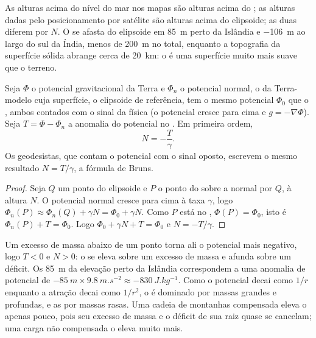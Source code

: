 As alturas acima do nível do mar nos mapas são alturas acima do ; as alturas dadas pelo posicionamento por satélite são alturas acima do elipsoide; as duas diferem por
$N$. O  se afasta do elipsoide em \qty{+85}{m} perto da Islândia e \qty{-106}{m} ao largo do sul da Índia, menos de \qty{200}{m} no total, enquanto a topografia
da superfície sólida abrange cerca de \qty{20}{km}: o  é uma superfície muito mais suave que o terreno.

\begin{proposition}\label{prop:b1:isostasy-gravity:bruns}
Seja $\Phi$ o potencial gravitacional da Terra e $\Phi_n$ o potencial normal,
o da Terra-modelo cuja superfície, o elipsoide de referência, tem o mesmo
potencial $\Phi_0$ que o , ambos contados com o sinal da física (o
potencial cresce para cima e $g = -\nabla\Phi$). Seja $T = \Phi - \Phi_n$ a
anomalia do potencial no . Em primeira ordem,
\[
  N = -\frac{T}{\gamma} .
\]
Os geodesistas, que contam o potencial com o sinal oposto, escrevem o mesmo
resultado $N = T/\gamma$, a fórmula de Bruns.
\end{proposition}

\begin{proof}
Seja $Q$ um ponto do elipsoide e $P$ o ponto do  sobre a
normal por $Q$, à altura $N$. O potencial normal cresce para cima
à taxa $\gamma$, logo $\Phi_n(P) \approx \Phi_n(Q) + \gamma N = \Phi_0 +
\gamma N$. Como $P$ está no , $\Phi(P) = \Phi_0$, isto é
$\Phi_n(P) + T = \Phi_0$. Logo $\Phi_0 + \gamma N + T = \Phi_0$ e $N =
-T/\gamma$.
\end{proof}

Um excesso de massa abaixo de um ponto torna ali o potencial mais negativo, logo
$T < 0$ e $N > 0$: o  se eleva sobre um excesso de massa e afunda sobre um
déficit. Os \qty{85}{m} da elevação perto da Islândia correspondem a uma anomalia de potencial
de $-\qty{85}{m}\times\qty{9.8}{m.s^{-2}} \approx \qty{-830}{J.kg^{-1}}$.
Como o potencial decai como $1/r$ enquanto a atração decai como $1/r^2$,
o  é dominado por massas grandes e profundas, e as  por
massas rasas. Uma cadeia de montanhas compensada eleva o  apenas pouco,
pois seu excesso de massa e o déficit de sua raiz quase se cancelam; uma
carga não compensada o eleva muito mais.

